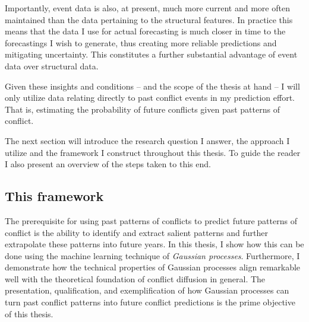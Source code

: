 \documentclass[a4paper]{article}
\begin{document}
Importantly, event data is also, at present, much more current and more often maintained than the data pertaining to the structural features. In practice this means that the data I use for actual forecasting is much closer in time to the forecastings I wish to generate, thus creating more reliable predictions and mitigating uncertainty. This constitutes a further substantial advantage of event data over structural data.\par

Given these insights and conditions -- and the scope of the thesis at hand -- I will only utilize data relating directly to past conflict events in my prediction effort. That is, estimating the probability of future conflicts given past patterns of conflict.\par

The next section will introduce the research question I answer, the approach I utilize and the framework I construct throughout this thesis. To guide the reader I also present an overview of the steps taken to this end.\par 


\subsection{This framework}

The prerequisite for using past patterns of conflicts to predict future patterns of conflict is the ability to identify and extract salient patterns and further extrapolate these patterns into future years. In this thesis, I show how this can be done using the machine learning technique of \emph{Gaussian processes}. Furthermore, I demonstrate how the technical properties of Gaussian processes align remarkable well with the theoretical foundation of conflict diffusion in general. The presentation, qualification, and exemplification of how Gaussian processes can turn past conflict patterns into future conflict predictions is the prime objective of this thesis.\par
\end{document}
